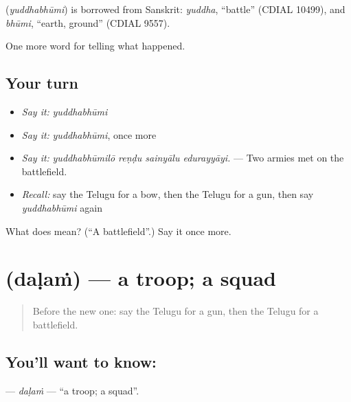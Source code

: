 \begin{cousinweb}
\textbf{} (\emph{yuddhabhūmi}) is borrowed from Sanskrit: \emph{yuddha}, \textquotedblleft{}battle\textquotedblright{} (CDIAL 10499), and \emph{bhūmi}, \textquotedblleft{}earth, ground\textquotedblright{} (CDIAL 9557).
\end{cousinweb}

\begin{grammarlens}[title={What you've built}]
One more word for telling what happened.
\end{grammarlens}

\subsection*{Your turn}
\begin{itemize}
\raggedright
  \item \emph{Say it:} \emph{yuddhabhūmi}
  \item \emph{Say it:} \emph{yuddhabhūmi}, once more
  \item \emph{Say it:} \emph{yuddhabhūmilō reṇḍu sainyālu edurayyāyi.} — Two armies met on the battlefield.
  \item \emph{Recall:} say the Telugu for a bow, then the Telugu for a gun, then say \emph{yuddhabhūmi} again
\end{itemize}

\begin{tcolorbox}[breakable,colback=teal!4,colframe=teal!35!black,title={Before you move on}]
What does  mean? (\textquotedblleft{}A battlefield\textquotedblright{}.) Say it once more.
\end{tcolorbox}
\section[\texorpdfstring{\te{దళం} (daḷaṁ)}{దళం (daḷaṁ)}]{ (daḷaṁ) — a troop; a squad}

\label{lesson:TE-C361-dalam}



\begin{quote}
Before the new one: say the Telugu for a gun, then the Telugu for a battlefield.
\end{quote}

\subsection*{You'll want to know: }
\textbf{} — \emph{daḷaṁ} — \textquotedblleft{}a troop; a squad\textquotedblright{}.

